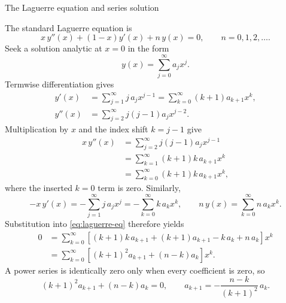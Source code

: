 \documentclass[11pt]{beamer}
\begin{document}
\begin{frame}[allowframebreaks]{The Laguerre equation and series solution}
\footnotesize

The standard Laguerre equation is
\begin{equation}
  x\,y''(x)+(1-x)y'(x)+n\,y(x)=0,
  \qquad n=0,1,2,\ldots .
  \label{eq:laguerre-eq}
\end{equation}
Seek a solution analytic at $x=0$ in the form
\[
  y(x)=\sum_{j=0}^{\infty}a_jx^j .
\]
Termwise differentiation gives
\begin{align*}
  y'(x)
    &=\sum_{j=1}^{\infty}j\,a_jx^{j-1}
      =\sum_{k=0}^{\infty}(k+1)a_{k+1}x^k,\\
  y''(x)
    &=\sum_{j=2}^{\infty}j(j-1)a_jx^{j-2}.
\end{align*}
Multiplication by $x$ and the index shift $k=j-1$ give
\begin{align*}
  x\,y''(x)
    &=\sum_{j=2}^{\infty}j(j-1)a_jx^{j-1}\\
    &=\sum_{k=1}^{\infty}(k+1)k\,a_{k+1}x^k\\
    &=\sum_{k=0}^{\infty}(k+1)k\,a_{k+1}x^k,
\end{align*}
where the inserted $k=0$ term is zero.  Similarly,
\[
  -x\,y'(x)
   =-\sum_{j=1}^{\infty}j\,a_jx^j
   =-\sum_{k=0}^{\infty}k\,a_kx^k,
  \qquad
  n\,y(x)=\sum_{k=0}^{\infty}n\,a_kx^k .
\]
Substitution into \eqref{eq:laguerre-eq} therefore yields
\begin{align*}
  0
   &=\sum_{k=0}^{\infty}
      \left[
        (k+1)k\,a_{k+1}
        +(k+1)a_{k+1}
        -k\,a_k+n\,a_k
      \right]x^k\\
   &=\sum_{k=0}^{\infty}
      \left[
        (k+1)^2a_{k+1}+(n-k)a_k
      \right]x^k .
\end{align*}
A power series is identically zero only when every coefficient is zero, so
\begin{equation}
  (k+1)^2a_{k+1}+(n-k)a_k=0,
  \qquad
  a_{k+1}=-\frac{n-k}{(k+1)^2}\,a_k .
  \label{eq:laguerre-coeff-recurrence}
\end{equation}


\end{frame}
\end{document}

